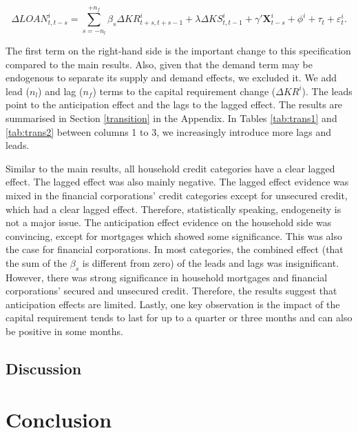 \documentclass[
]{article}
\begin{document}
\[
\Delta LOAN^i_{t, t-s} = \sum_{s = -n_l}^{+n_f}\beta_s\Delta KR^i_{t+s, t+s-1} + \lambda \Delta KS^i_{t, t-1} + \gamma'  \pmb{X}^i_{t-s} + \phi^i + \tau_t + \varepsilon^i_t.
\]

The first term on the right-hand side is the important change to this specification compared to the main results. Also, given that the demand term may be endogenous to separate its supply and demand effects, we excluded it. We add lead (\(n_l\)) and lag (\(n_f\)) terms to the capital requirement change (\(\Delta KR^i\)). The leads point to the anticipation effect and the lags to the lagged effect. The results are summarised in Section \ref{transition} in the Appendix. In Tables \ref{tab:trans1} and \ref{tab:trans2} between columns 1 to 3, we increasingly introduce more lags and leads.

Similar to the main results, all household credit categories have a clear lagged effect. The lagged effect was also mainly negative. The lagged effect evidence was mixed in the financial corporations' credit categories except for unsecured credit, which had a clear lagged effect. Therefore, statistically speaking, endogeneity is not a major issue. The anticipation effect evidence on the household side was convincing, except for mortgages which showed some significance. This was also the case for financial corporations. In most categories, the combined effect (that the sum of the \(\beta_s\) is different from zero) of the leads and lags was insignificant. However, there was strong significance in household mortgages and financial corporations' secured and unsecured credit. Therefore, the results suggest that anticipation effects are limited. Lastly, one key observation is the impact of the capital requirement tends to last for up to a quarter or three months and can also be positive in some months.

\hypertarget{discussion}{%
\subsection{Discussion}\label{discussion}}

\citet{de2020bank}

\citet{imbierowicz2018time}

\hypertarget{conclusion}{%
\section{Conclusion}\label{conclusion}}

\newpage
\end{document}
